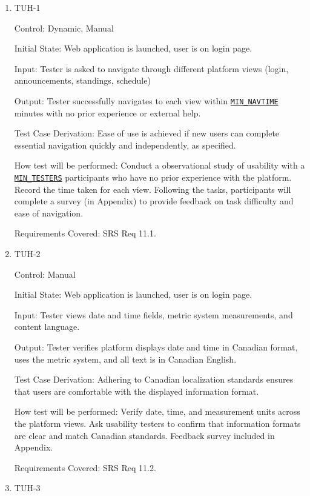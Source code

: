 \documentclass[12pt, titlepage]{article}
\begin{document}
\begin{enumerate}

\item{TUH-1\\}

Control: Dynamic, Manual
					
Initial State:  Web application is launched, user is on login page.
					
Input: Tester is asked to navigate through different platform views (login, announcements, standings, schedule)
					
Output: Tester successfully navigates to each view within \hyperref[MIN_NAVTIME]{\texttt{MIN\_NAVTIME}} minutes with no prior experience or external help.

Test Case Derivation: Ease of use is achieved if new users can complete essential navigation quickly and independently, as specified.
					
How test will be performed: Conduct a observational study of usability with a \hyperref[MIN_TESTERS]{\texttt{MIN\_TESTERS}} participants who have no prior experience with the platform. Record the time taken for each view. Following the tasks, participants will complete a survey (in Appendix) to provide feedback on task difficulty and ease of navigation.

Requirements Covered: SRS Req 11.1.

\item{TUH-2\\}

Control: Manual
					
Initial State:  Web application is launched, user is on login page.
					
Input: Tester views date and time fields, metric system measurements, and content language.
					
Output: Tester verifies platform displays date and time in Canadian format, uses the metric system, and all text is in Canadian English.

Test Case Derivation: Adhering to Canadian localization standards ensures that users are comfortable with the displayed information format.
					
How test will be performed: Verify date, time, and measurement units across the platform views. Ask usability testers to confirm that information formats are clear and match Canadian standards. Feedback survey included in Appendix.

Requirements Covered: SRS Req 11.2.

\item{TUH-3\\}


\end{enumerate}
\end{document}
